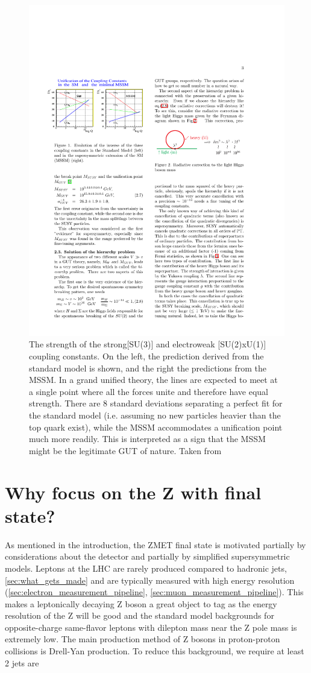     \begin{figure}[h!]
      \centering
      \includegraphics[width=.7\textwidth]{figures/SUSY_GUT_couplings.pdf}
      \caption{The strength of the strong[SU(3)] and electroweak [SU(2)xU(1)] coupling constants. On the left, the prediction derived from the standard model is shown, and the right the predictions from the MSSM. In a grand unified theory, the lines are expected to meet at a single point where all the forces unite and therefore have equal strength. There are 8 standard deviations separating a perfect fit for the standard model (i.e. assuming no new particles heavier than the top quark exist), while the MSSM accommodates a unification point much more readily. This is interpreted as a sign that the MSSM might be the legitimate GUT of nature. Taken from \cite{SUSY_RG}}
      \label{fig:susy_gut}
    \end{figure}
    
\section{Why focus on the Z with \MET final state?}
  As mentioned in the introduction, the ZMET final state is motivated partially by considerations about the detector and partially by simplified supersymmetric models. Leptons at the LHC are rarely produced compared to hadronic jets,\ref{sec:what_gets_made} and are typically measured with high energy resolution (\ref{sec:electron_measurement_pipeline}, \ref{sec:muon_measurement_pipeline}). This makes a leptonically decaying Z boson a great object to tag as the energy resolution of the Z will be good and the standard model backgrounds for opposite-charge same-flavor leptons with dilepton mass near the Z pole mass is extremely low. The main production method of Z bosons in proton-proton collisions is Drell-Yan production. To reduce this background, we require at least 2 jets are 

